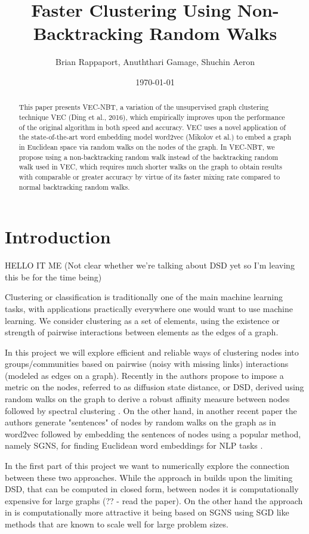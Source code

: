 \documentclass{article}
\title{Faster Clustering Using Non-Backtracking Random Walks}
\author{Brian Rappaport, Anuththari Gamage, Shuchin Aeron}
\affil{Tufts University\\Department of Electrical and Computer Engineering}
\date{\today}
\begin{document}
\maketitle

\begin{abstract}
This paper presents VEC-NBT, a variation of the unsupervised graph clustering
technique VEC (Ding et al., 2016), which empirically improves upon the
performance of the original algorithm in both speed and accuracy. VEC uses a
novel application of the state-of-the-art word embedding model word2vec (Mikolov
et al.) to embed a graph in Euclidean space via random walks on the nodes of the
graph. In VEC-NBT, we propose using a non-backtracking random walk instead of
the backtracking random walk used in VEC, which requires much shorter walks on
the graph to obtain results with comparable or greater accuracy by virtue of its
faster mixing rate compared to normal backtracking random walks.
\end{abstract}


\section{Introduction}

HELLO IT ME
(Not clear whether we're talking about DSD yet so I'm leaving this be for the
time being)

Clustering or classification is traditionally one of the main machine learning
tasks, with applications practically everywhere one would want to use machine
learning. We consider clustering as a set of elements, using the existence or
strength of pairwise interactions between elements as the edges of a graph. 

In this project we will explore efficient and reliable ways of clustering nodes
into groups/communities based on pairwise (noisy with missing links)
interactions (modeled as edges on a graph). Recently in \cite{DSD} the authors
propose to impose a metric on the nodes, referred to as diffusion state
distance, or DSD, derived using random walks on the graph to derive a robust
affinity measure between nodes followed by spectral clustering \cite{Luxburg}.
On the other hand, in another recent paper \cite{NodeEmbed} the authors generate
"sentences" of nodes by random walks on the graph as in word2vec \cite{word2vec}
followed by embedding the sentences of nodes using a popular method, namely
SGNS, for finding Euclidean word embeddings for NLP tasks \cite{LevyGoldberg}.

In the first part of this project we want to numerically explore the connection
between these two approaches. While the approach in \cite{DSD} builds upon the
limiting DSD, that can be computed in closed form, between nodes it is
computationally expensive for large graphs (?? - read the paper). On the other
hand the approach in \cite{NodeEmbed} is computationally more attractive it
being based on SGNS using SGD like methods that are known to scale well for
large problem sizes.
\end{document}
